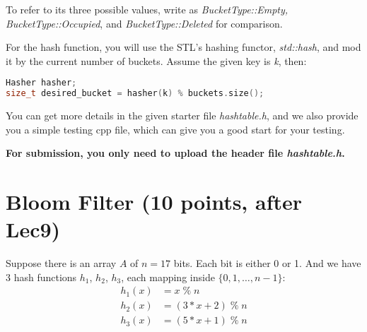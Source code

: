 \documentclass[11pt]{exam}
\begin{document}
To refer to its three possible values, write as \textit{BucketType::Empty, BucketType::Occupied}, and \textit{BucketType::Deleted} for comparison.

For the hash function, you will use the STL's hashing functor, \textit{std::hash}, and mod it by the current number of buckets. Assume the given key is \textit{k}, then:
\begin{lstlisting}[language=c++]
Hasher hasher;
size_t desired_bucket = hasher(k) % buckets.size();
\end{lstlisting}

You can get more details in the given starter file \textit{hashtable.h}, and we also provide you a simple testing cpp file, which can give you a good start for your testing.

\textbf{For submission, you only need to upload the header file \textit{hashtable.h}.}

\newpage

\section{Bloom Filter (10 points, after Lec9)}
Suppose there is an array $A$ of $n=17$ bits. Each bit is either 0 or 1. And we have 3 hash functions $h_1$, $h_2$, $h_3$, each mapping inside $\{0,1,\dots,n-1\}$:
\begin{align*}
h_1(x) &= x \;\%\; n\\
h_2(x) &= (3*x+2) \;\%\; n\\
h_3(x) &= (5*x+1) \;\%\; n 
\end{align*}
\end{document}
